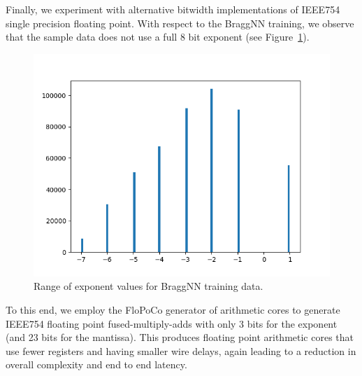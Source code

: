 Finally, we experiment with alternative bitwidth implementations of IEEE754 single precision floating point.
With respect to the BraggNN training, we observe that the sample data does not use a full 8 bit exponent (see Figure~\ref{fig:numexp}).
\begin{figure}
	\includegraphics[width=\columnwidth]{figures/exp_bits}
	\caption{Range of exponent values for BraggNN training data.}\label{fig:numexp}
\end{figure}
To this end, we employ the FloPoCo\cite{8877424} generator of arithmetic cores to generate IEEE754 floating point fused-multiply-adds with only 3 bits for the exponent (and 23 bits for the mantissa).
This produces floating point arithmetic cores that use fewer registers and having smaller wire delays, again leading to a reduction in overall complexity and end to end latency.
